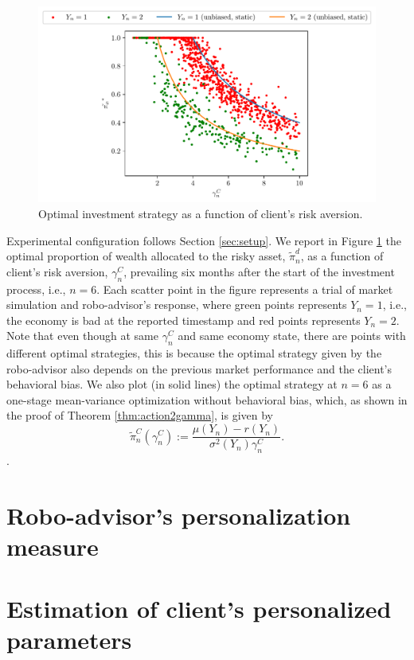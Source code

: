 \begin{figure}[t]
    \centering
    \includegraphics[width=\textwidth]{imgs/optimal_strategy.pdf}
    \caption{Optimal investment strategy as a function of client's risk aversion.}
    \label{fig:opt}
\end{figure}

Experimental configuration follows Section \ref{sec:setup}. We report in Figure \ref{fig:opt} the optimal proportion of wealth allocated to the risky asset, $\tilde\pi_n^d$, as a function of client's risk aversion, $\gamma_n^C$, prevailing six months after the start of the investment process, i.e., $n=6$. Each scatter point in the figure represents a trial of market simulation and robo-advisor's response, where green points represents $Y_n=1$, i.e., the economy is bad at the reported timestamp and red points represents $Y_n=2$. Note that even though at same $\gamma_n^C$ and same economy state, there are points with different optimal strategies, this is because the optimal strategy given by the robo-advisor also depends on the previous market performance and the client's behavioral bias. We also plot (in solid lines) the optimal strategy at $n=6$ as a one-stage mean-variance optimization without behavioral bias, which, as shown in the proof of Theorem \ref{thm:action2gamma}, is given by $$\tilde\pi_n^{C}(\gamma_n^C):=\frac{\mu(Y_n)-r(Y_n)}{\sigma^2(Y_n)\gamma_n^C}.$$.

\section{Robo-advisor's personalization measure}\label{sec:personalize}
\section{Estimation of client's personalized parameters}